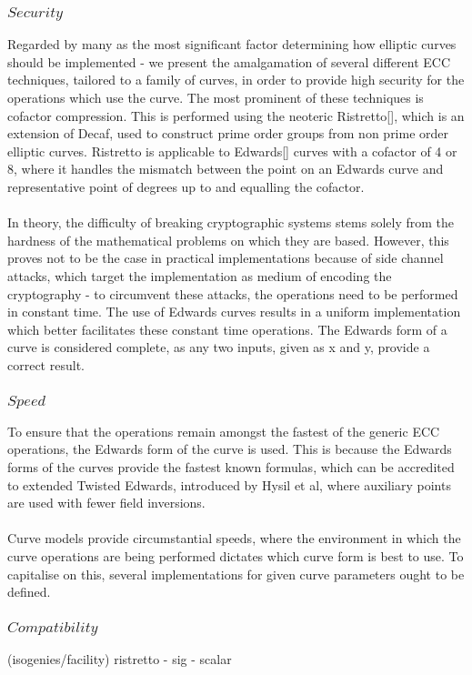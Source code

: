 \documentclass{article}
\begin{document}
\subsubsection{$Security$}  Regarded by many as the most significant factor determining how elliptic curves should be implemented - we present the amalgamation of several different ECC techniques, tailored to a family of curves, in order to provide high security for the operations which use the curve. The most prominent of these techniques is cofactor compression. This is performed using the neoteric Ristretto[], which is an extension of Decaf, used to construct prime order groups from non prime order elliptic curves. Ristretto is applicable to Edwards[] curves with a cofactor of 4 or 8, where it handles the mismatch between the point on an Edwards curve and representative point of degrees up to and equalling the cofactor. \\\\
 In theory, the difficulty of breaking cryptographic systems stems solely from the hardness of the mathematical problems on which they are based. However, this proves not to be the case in practical implementations because of side channel attacks, which target the implementation as medium of encoding the cryptography - to circumvent these attacks, the operations need to be performed in constant time. The use of Edwards curves results in a uniform implementation which better facilitates these constant time operations. The Edwards form of a curve is considered complete, as any two inputs, given as x and y, provide a correct result.   
\subsubsection{$Speed$} To ensure that the operations remain amongst the fastest of the generic ECC operations, the Edwards form of the curve is used. This is because the Edwards forms of the curves provide the fastest known formulas, which can be accredited to extended Twisted Edwards, introduced by Hysil et al, where auxiliary points are used with fewer field inversions. \\\\
Curve models provide circumstantial speeds, where the environment in which the curve operations are being performed dictates which curve form is best to use. To capitalise on this, several implementations for given curve parameters ought to be defined. 
\subsubsection{$Compatibility$} (isogenies/facility) ristretto - sig - scalar
\end{document}
